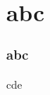 \documentclass{beamer}
\begin{document}
\maketitle

\begin{frame}
\tableofcontents
\end{frame}

\section{abc}
\begin{frame}
\frametitle{abc}
cde
\end{frame} 
\end{document}
